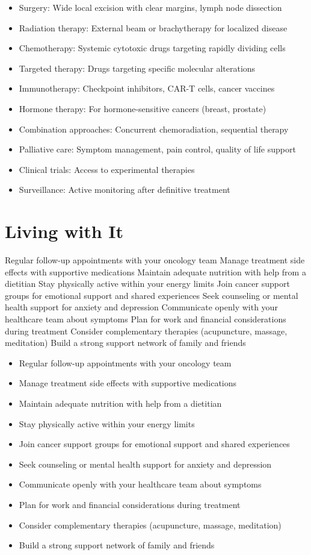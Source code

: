 \begin{itemize}[noitemsep]
  \item Surgery: Wide local excision with clear margins, lymph node dissection
  \item Radiation therapy: External beam or brachytherapy for localized disease
  \item Chemotherapy: Systemic cytotoxic drugs targeting rapidly dividing cells
  \item Targeted therapy: Drugs targeting specific molecular alterations
  \item Immunotherapy: Checkpoint inhibitors, CAR-T cells, cancer vaccines
  \item Hormone therapy: For hormone-sensitive cancers (breast, prostate)
  \item Combination approaches: Concurrent chemoradiation, sequential therapy
  \item Palliative care: Symptom management, pain control, quality of life support
  \item Clinical trials: Access to experimental therapies
  \item Surveillance: Active monitoring after definitive treatment
\end{itemize}
\section{Living with It}
Regular follow-up appointments with your oncology team Manage treatment side effects with supportive medications Maintain adequate nutrition with help from a dietitian Stay physically active within your energy limits Join cancer support groups for emotional support and shared experiences Seek counseling or mental health support for anxiety and depression Communicate openly with your healthcare team about symptoms Plan for work and financial considerations during treatment Consider complementary therapies (acupuncture, massage, meditation) Build a strong support network of family and friends

\begin{itemize}[noitemsep]
  \item Regular follow-up appointments with your oncology team
  \item Manage treatment side effects with supportive medications
  \item Maintain adequate nutrition with help from a dietitian
  \item Stay physically active within your energy limits
  \item Join cancer support groups for emotional support and shared experiences
  \item Seek counseling or mental health support for anxiety and depression
  \item Communicate openly with your healthcare team about symptoms
  \item Plan for work and financial considerations during treatment
  \item Consider complementary therapies (acupuncture, massage, meditation)
  \item Build a strong support network of family and friends
\end{itemize}
